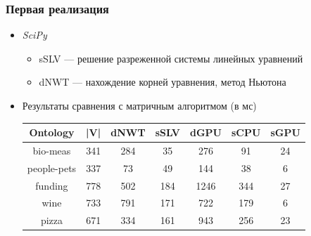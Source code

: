 \documentclass[xcolor=table]{beamer}
\begin{document}
\begin{frame}[fragile]
  \transwipe[direction=90]
  \frametitle{Первая реализация}

\begin{itemize}
    \item \textit{SciPy}
    \begin{itemize}
        \item sSLV --- решение разреженной системы линейных уравнений
        \item dNWT --- нахождение корней уравнения, метод Ньютона
    \end{itemize}
    \item Результаты сравнения с матричным алгоритмом (в мс)

        \begin{table}[h]
        \centering
        \begin{tabular}{ | c | c || c | c || c | c | c |}
        \hline
        Ontology    & |V| & dNWT & sSLV & dGPU & sCPU &  sGPU \\
        \hline
        \hline
        bio-meas    & 341 &  284 & 35   & 276  & 91  & 24\\
        people-pets & 337 &  73  & 49   & 144  & 38  & 6\\
        funding     & 778 &  502 & 184  & 1246 & 344 & 27\\
        wine        & 733 &  791 & 171  & 722  & 179 & 6\\
        pizza       & 671 &  334 & 161  & 943  & 256 & 23\\
        \hline
        \end{tabular}
        
        \end{table}

\end{itemize}
\end{frame}
\end{document}
